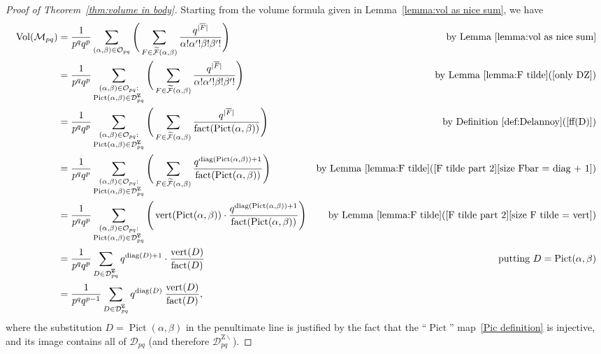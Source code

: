 \documentclass[noamsfonts,10pt]{amsart}
\newcommand{\M}{\mathcal{M}}
\newcommand{\D}{\mathcal{D}}
\newcommand{\DZ}{\mathcal{D}^{\mathrm{Z} \!\!\!\! \backslash}}
\newcommand{\al}{\alpha}
\newcommand{\be}{\beta}
\DeclareMathOperator{\Pic}{Pict}
\renewcommand{\O}{\mathcal{O}}
\newcommand{\F}{\mathcal{F}}
\newcommand{\dd}{\operatorname{diag}}
\newcommand{\vv}{\operatorname{vert}}
\newcommand{\ff}{\operatorname{fact}}
\DeclareMathOperator{\Vol}{Vol}
\newcommand{\1}{\mathbf{1}}
\theoremstyle{plain}
\theoremstyle{definition}
\numberwithin{equation}{section}
\begin{document}
\begin{proof}[Proof of Theorem~\ref{thm:volume in body}]

    Starting from the volume formula given in Lemma~\ref{lemma:vol as nice sum}, we have
    \begin{align*}
        \Vol(\M_{pq}) &= \frac{1}{p^q q^p} \sum_{(\al,\be) \in \O_{pq}} \Bigg(
        \sum_{F \in \widetilde{\F}(\al,\be)}
        \frac{q^{|\overline{F}|}}{\al!\al'!\be!\be'!}
        \Bigg) & \text{by Lemma~\ref{lemma:vol as nice sum}}\\
        &= \frac{1}{p^q q^p} \sum_{\substack{(\al,\be) \in \O_{pq}: \\ \Pic(\al,\be) \in \DZ_{pq}}} \Bigg(
        \sum_{F \in \widetilde{\F}(\al,\be)}
        \frac{q^{|\overline{F}|}}{\al!\al'!\be!\be'!}
        \Bigg) & \text{by Lemma~\ref{lemma:F tilde}(\ref{only DZ})} \\
        &= \frac{1}{p^q q^p} \sum_{\substack{(\al,\be) \in \O_{pq}: \\ \Pic(\al,\be) \in \DZ_{pq}}} \Bigg(
        \sum_{F \in \widetilde{\F}(\al,\be)}
        \frac{q^{|\overline{F}|}}{\ff(\Pic(\al,\be))}
        \Bigg) & \text{by Definition~\ref{def:Delannoy}(\ref{ff(D)})} \\
        &= \frac{1}{p^q q^p} \sum_{\substack{(\al,\be) \in \O_{pq}: \\ \Pic(\al,\be) \in \DZ_{pq}}} \Bigg(
        \sum_{F \in \widetilde{\F}(\al,\be)}
        \frac{q^{\dd(\Pic(\al,\be))+1}}{\ff(\Pic(\al,\be))}
        \Bigg) & \text{by Lemma~\ref{lemma:F tilde}(\ref{F tilde part 2}\ref{size Fbar = diag + 1})} \\
        &= \frac{1}{p^q q^p} \sum_{\substack{(\al,\be) \in \O_{pq}: \\ \Pic(\al,\be) \in \DZ_{pq}}} \Bigg(
        \vv(\Pic(\al,\be)) \cdot     \frac{q^{\dd(\Pic(\al,\be))+1}}{\ff(\Pic(\al,\be))}
        \Bigg) & \text{by Lemma~\ref{lemma:F tilde}(\ref{F tilde part 2}\ref{size F tilde = vert})} \\
        &= \frac{1}{p^q q^p} \sum_{D \in \DZ_{pq}} q^{\dd(D)+1} \cdot \frac{\vv(D)}{\ff(D)} & \text{putting $D = \Pic(\al,\be)$} \\
        &= \frac{1}{p^q q^{p-1}} \sum_{D \in \DZ_{pq}} q^{\dd(D)} \: \frac{\vv(D)}{\ff(D)},
    \end{align*}
    where the substitution $D = \Pic(\al,\be)$ in the penultimate line is justified by the fact that the ``$\Pic$'' map~\eqref{Pic definition} is injective, and its image contains all of $\D_{pq}$ (and therefore $\DZ_{pq}$).
\end{proof}
\end{document}
